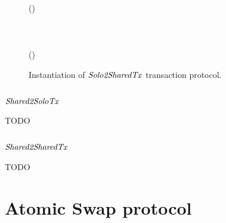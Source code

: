 \begin{figure}
\begin{center}
{\begin{varwidth}{\textwidth}
{            \< \scriptstyle (\varSigAlice \opSeperate \varSigBob) \opFunResult {} \< \\
              \< \< \\
            \varSigFin \opFunResult \procFinSig{\varSigAlice}{\varSigBob} \< \< \\
            \varExcess \opAssign {} \opAddPoint {} \< \< \\
            \scriptstyle \pcreturn \varTx \opAssign \varTx \opUnion (\varExcess \opSeperate \varSigFin \opSeperate \varProof)
            }
        \end{varwidth}
        }
    \end{center}
    \caption{Instantiation of $\mathit{Solo2SharedTx}$ transaction protocol. \label{fig:So2MuTx}}
\end{figure}

\subsection{$\mathit{Shared2SoloTx}$}

TODO

\subsection{$\mathit{Shared2SharedTx}$}

TODO

\section{Atomic Swap protocol}\label{sec:atomic-swap}